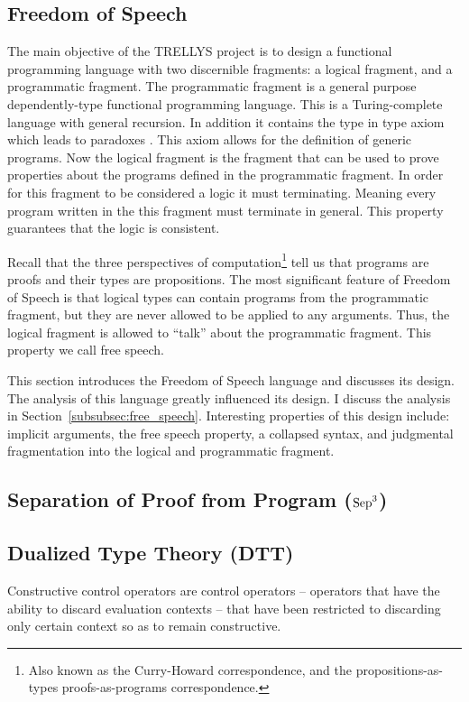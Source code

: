 \subsection{Freedom of Speech}
\label{subsec:freedom_of_speech}
The main objective of the TRELLYS project is to design a functional
programming language with two discernible fragments: a logical
fragment, and a programmatic fragment.  The programmatic fragment is a
general purpose dependently-type functional programming language.
This is a Turing-complete language with general recursion.  In
addition it contains the type in type axiom which leads to paradoxes
\cite{Coquand:1986,Coquand:1994}.  This axiom allows for the
definition of generic programs.  Now the logical fragment is the
fragment that can be used to prove properties about the programs
defined in the programmatic fragment.  In order for this fragment to
be considered a logic it must terminating.  Meaning every program
written in the this fragment must terminate in general.  This property
guarantees that the logic is consistent.

Recall that the three perspectives of computation\footnote{Also known
  as the Curry-Howard correspondence, and the propositions-as-types
  proofs-as-programs correspondence.} tell us that programs are proofs
and their types are propositions.  The most significant feature of
Freedom of Speech is that logical types can contain programs from the
programmatic fragment, but they are never allowed to be applied to any
arguments.  Thus, the logical fragment is allowed to ``talk'' about
the programmatic fragment.  This property we call free speech.

This section introduces the Freedom of Speech language and discusses
its design.  The analysis of this language greatly influenced its
design.  I discuss the analysis in
Section~\ref{subsubsec:free_speech}.  Interesting properties of this
design include: implicit arguments, the free speech property, a
collapsed syntax, and judgmental fragmentation into the logical and
programmatic fragment.

\subsection{Separation of Proof from Program ($\text{Sep}^3$) }
\label{subsec:separation_of_proof_from_program}


\subsection{Dualized Type Theory (DTT)}
\label{subsec:dualized_type_theory}
Constructive control operators are control operators -- operators that
have the ability to discard evaluation contexts -- that have been
restricted to discarding only certain context so as to remain
constructive.

